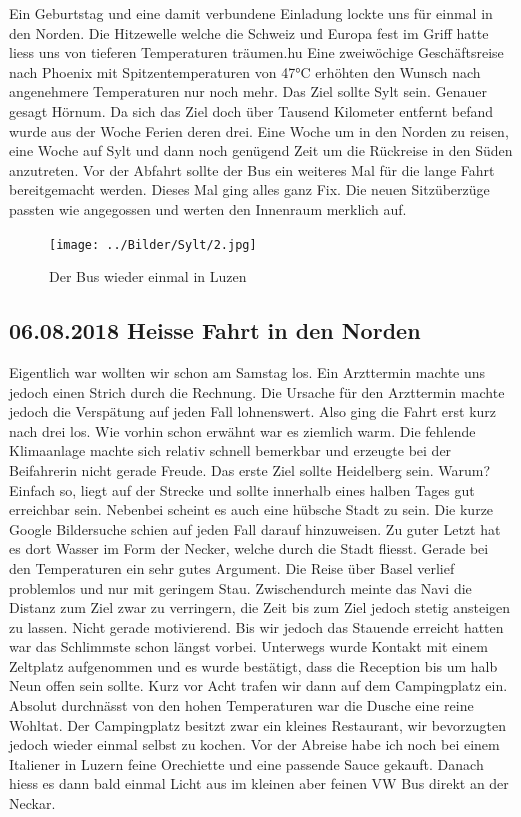 Ein Geburtstag und eine damit verbundene Einladung lockte uns für einmal in den Norden.
Die Hitzewelle welche die Schweiz und Europa fest im Griff hatte liess uns von tieferen Temperaturen träumen.hu
Eine zweiwöchige Geschäftsreise nach Phoenix mit Spitzentemperaturen von 47°C erhöhten den Wunsch nach angenehmere Temperaturen nur noch mehr.
Das Ziel sollte Sylt sein.
Genauer gesagt Hörnum.
Da sich das Ziel doch über Tausend Kilometer entfernt befand wurde aus der Woche Ferien deren drei.
Eine Woche um in den Norden zu reisen, eine Woche auf Sylt und dann noch genügend Zeit um die Rückreise in den Süden anzutreten. 
Vor der Abfahrt sollte der Bus ein weiteres Mal für die lange Fahrt bereitgemacht werden.
Dieses Mal ging alles ganz Fix.
Die neuen Sitzüberzüge passten wie angegossen und werten den Innenraum merklich auf.

\begin{figure}[hb]
    \centering
    \texttt{[image: ../Bilder/Sylt/2.jpg]}
    \caption{Der Bus wieder einmal in Luzen}
    \label{img:Sylt}
\end{figure}

\newpage
\subsection{06.08.2018 Heisse Fahrt in den Norden} 
Eigentlich war wollten wir schon am Samstag los. Ein Arzttermin machte uns jedoch einen Strich durch die Rechnung.
Die Ursache für den Arzttermin machte jedoch die Verspätung auf jeden Fall lohnenswert.
Also ging die Fahrt erst kurz nach drei los.
Wie vorhin schon erwähnt war es ziemlich warm.
Die fehlende Klimaanlage machte sich relativ schnell bemerkbar und erzeugte bei der Beifahrerin nicht gerade Freude.
Das erste Ziel sollte Heidelberg sein.
Warum?
Einfach so, liegt auf der Strecke und sollte innerhalb eines halben Tages gut erreichbar sein.
Nebenbei scheint es auch eine hübsche Stadt zu sein. 
Die kurze Google Bildersuche schien auf jeden Fall darauf hinzuweisen.
Zu guter Letzt hat es dort Wasser im Form der Necker, welche durch die Stadt fliesst.
Gerade bei den Temperaturen ein sehr gutes Argument.
Die Reise über Basel verlief problemlos und nur mit geringem Stau.
Zwischendurch meinte das Navi die Distanz zum Ziel zwar zu verringern, die Zeit bis zum Ziel jedoch stetig ansteigen zu lassen.
Nicht gerade motivierend.
Bis wir jedoch das Stauende erreicht hatten war das Schlimmste schon längst vorbei.
Unterwegs wurde Kontakt mit einem Zeltplatz aufgenommen und es wurde bestätigt, dass die Reception bis um halb Neun offen sein sollte.
Kurz vor Acht trafen wir dann auf dem Campingplatz ein.
Absolut durchnässt von den hohen Temperaturen war die Dusche eine reine Wohltat.
Der Campingplatz besitzt zwar ein kleines Restaurant, wir bevorzugten jedoch wieder einmal selbst zu kochen.
Vor der Abreise habe ich noch bei einem Italiener in Luzern feine Orechiette und eine passende Sauce gekauft.
Danach hiess es dann bald einmal Licht aus im kleinen aber feinen VW Bus direkt an der Neckar.

